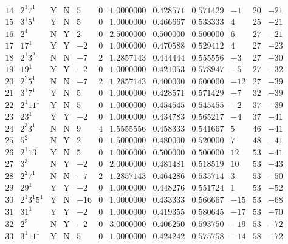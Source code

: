 \documentclass[11pt,reqno,a4letter]{article}
\numberwithin{figure}{section}
\numberwithin{table}{section}
\theoremstyle{plain}
\numberwithin{theorem}{section}
\theoremstyle{definition}
\begin{document}
\begin{table}[h!]
\begin{equation*}
{\begin{array}{cc|cc|ccc|cc|ccc}
 14 & 2^1 7^1 & \text{Y} & \text{N} & 5 & 0 & 1.0000000 & 0.428571 & 0.571429 & -1 & 20 & -21 \\
 15 & 3^1 5^1 & \text{Y} & \text{N} & 5 & 0 & 1.0000000 & 0.466667 & 0.533333 & 4 & 25 & -21 \\
 16 & 2^4 & \text{N} & \text{Y} & 2 & 0 & 2.5000000 & 0.500000 & 0.500000 & 6 & 27 & -21 \\
 17 & 17^1 & \text{Y} & \text{Y} & -2 & 0 & 1.0000000 & 0.470588 & 0.529412 & 4 & 27 & -23 \\
 18 & 2^1 3^2 & \text{N} & \text{N} & -7 & 2 & 1.2857143 & 0.444444 & 0.555556 & -3 & 27 & -30 \\
 19 & 19^1 & \text{Y} & \text{Y} & -2 & 0 & 1.0000000 & 0.421053 & 0.578947 & -5 & 27 & -32 \\
 20 & 2^2 5^1 & \text{N} & \text{N} & -7 & 2 & 1.2857143 & 0.400000 & 0.600000 & -12 & 27 & -39 \\
 21 & 3^1 7^1 & \text{Y} & \text{N} & 5 & 0 & 1.0000000 & 0.428571 & 0.571429 & -7 & 32 & -39 \\
 22 & 2^1 11^1 & \text{Y} & \text{N} & 5 & 0 & 1.0000000 & 0.454545 & 0.545455 & -2 & 37 & -39 \\
 23 & 23^1 & \text{Y} & \text{Y} & -2 & 0 & 1.0000000 & 0.434783 & 0.565217 & -4 & 37 & -41 \\
 24 & 2^3 3^1 & \text{N} & \text{N} & 9 & 4 & 1.5555556 & 0.458333 & 0.541667 & 5 & 46 & -41 \\
 25 & 5^2 & \text{N} & \text{Y} & 2 & 0 & 1.5000000 & 0.480000 & 0.520000 & 7 & 48 & -41 \\
 26 & 2^1 13^1 & \text{Y} & \text{N} & 5 & 0 & 1.0000000 & 0.500000 & 0.500000 & 12 & 53 & -41 \\
 27 & 3^3 & \text{N} & \text{Y} & -2 & 0 & 2.0000000 & 0.481481 & 0.518519 & 10 & 53 & -43 \\
 28 & 2^2 7^1 & \text{N} & \text{N} & -7 & 2 & 1.2857143 & 0.464286 & 0.535714 & 3 & 53 & -50 \\
 29 & 29^1 & \text{Y} & \text{Y} & -2 & 0 & 1.0000000 & 0.448276 & 0.551724 & 1 & 53 & -52 \\
 30 & 2^1 3^1 5^1 & \text{Y} & \text{N} & -16 & 0 & 1.0000000 & 0.433333 & 0.566667 & -15 & 53 & -68 \\
 31 & 31^1 & \text{Y} & \text{Y} & -2 & 0 & 1.0000000 & 0.419355 & 0.580645 & -17 & 53 & -70 \\
 32 & 2^5 & \text{N} & \text{Y} & -2 & 0 & 3.0000000 & 0.406250 & 0.593750 & -19 & 53 & -72 \\
 33 & 3^1 11^1 & \text{Y} & \text{N} & 5 & 0 & 1.0000000 & 0.424242 & 0.575758 & -14 & 58 & -72 \\

\end{array}}
\end{equation*}
\end{table}
\end{document}
